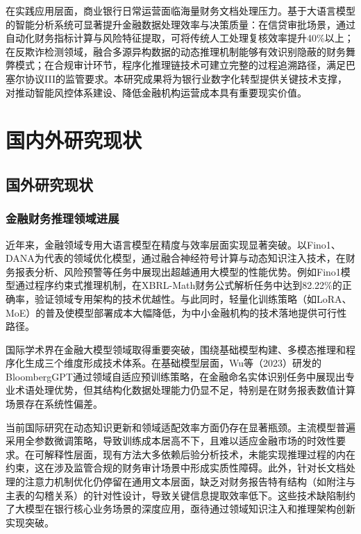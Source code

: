 \documentclass[professional,privacy,print,win,long,STEM,AutoFakeBold]{def/buaa}
\begin{document}
在实践应用层面，商业银行日常运营面临海量财务文档处理压力。基于大语言模型的智能分析系统可显著提升金融数据处理效率与决策质量：在信贷审批场景，通过自动化财务指标计算与风险特征提取，可将传统人工处理复核效率提升40\%以上；在反欺诈检测领域，融合多源异构数据的动态推理机制能够有效识别隐蔽的财务舞弊模式；在合规审计环节，程序化推理链技术可建立完整的过程追溯路径，满足巴塞尔协议III的监管要求。本研究成果将为银行业数字化转型提供关键技术支撑，对推动智能风控体系建设、降低金融机构运营成本具有重要现实价值。


\section{国内外研究现状}

\subsection{国外研究现状}

\subsubsection{金融财务推理领域进展}

近年来，金融领域专用大语言模型在精度与效率层面实现显著突破。以Fino1、DANA为代表的领域优化模型，通过融合神经符号计算与动态知识注入技术，在财务报表分析、风险预警等任务中展现出超越通用大模型的性能优势。例如Fino1模型通过程序约束式推理机制，在XBRL-Math财务公式解析任务中达到82.22\%的正确率，验证领域专用架构的技术优越性。与此同时，轻量化训练策略（如LoRA、MoE）的普及使模型部署成本大幅降低，为中小金融机构的技术落地提供可行性路径。

国际学术界在金融大模型领域取得重要突破，围绕基础模型构建、多模态推理和程序化生成三个维度形成技术体系。在基础模型层面，Wu等（2023）研发的BloombergGPT通过领域自适应预训练策略，在金融命名实体识别任务中展现出专业术语处理优势，但其结构化数据处理能力仍显不足，特别是在财务报表数值计算场景存在系统性偏差。

当前国际研究在动态知识更新和领域适配效率方面仍存在显著瓶颈。主流模型普遍采用全参数微调策略，导致训练成本居高不下，且难以适应金融市场的时效性要求。在可解释性层面，现有方法大多依赖后验分析技术，未能实现推理过程的内在约束，这在涉及监管合规的财务审计场景中形成实质性障碍。此外，针对长文档处理的注意力机制优化仍停留在通用文本层面，缺乏对财务报告特有结构（如附注与主表的勾稽关系）的针对性设计，导致关键信息提取效率低下。这些技术缺陷制约了大模型在银行核心业务场景的深度应用，亟待通过领域知识注入和推理架构创新实现突破。
\end{document}
